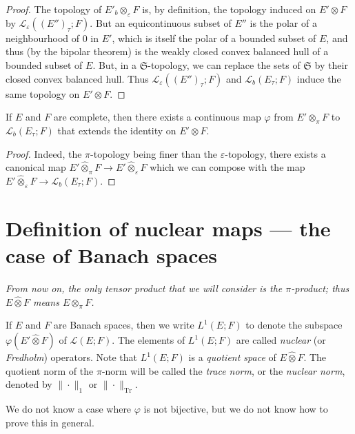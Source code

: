 \documentclass{article}
\theoremstyle{plain}
\newenvironment{corollary}[1]
    {\renewcommand\theinnercustomcorollary{#1}\innercustomcorollary}
    {\endinnercustomcorollary}
\theoremstyle{definition}
\newenvironment{definition}[1]
    {\renewcommand\theinnercustomdefinition{#1}\innercustomdefinition}
    {\endinnercustomdefinition}
\newcommand{\LL}{\mathcal{L}}
\newcommand{\projotimes}{{\otimes}_\pi}
\newcommand{\injotimes}{{\otimes}_\varepsilon}
\newcommand{\cprojotimes}{\widehat{\otimes}_\pi}
\newcommand{\cinjotimes}{\widehat{\otimes}_\varepsilon}
\newcommand{\cotimes}{\widehat{\otimes}}
\newcommand{\tr}{\operatorname{Tr}}
\newcommand{\oldpage}[1]{\marginpar{\footnotesize$\Big\vert$ \textit{p.~#1}}}
\begin{document}
\begin{proof}
  The topology of $E'_b\injotimes F$ is, by definition, the topology induced on $E'\otimes F$ by $\LL_\varepsilon((E'')_\tau;F)$.
  But an equicontinuous subset of $E''$ is the  polar of a neighbourhood of $0$ in $E'$, which is itself the polar of a bounded subset of $E$, and thus (by the bipolar theorem) is the weakly closed convex balanced hull of a bounded subset of $E$.
  But, in a $\mathfrak{S}$-topology, we can replace the sets of $\mathfrak{S}$ by their closed convex balanced hull.
  Thus $\LL_\varepsilon((E'')_\tau;F)$ and $\LL_b(E_\tau;F)$ induce the same topology on $E'\otimes F$.
\end{proof}

\begin{corollary}{1}
\label{corollary-1}
  If $E$ and $F$ are complete, then there exists a continuous map $\varphi$ from $E'\projotimes F$ to $\LL_b(E_\tau;F)$ that extends the identity on $E'\otimes F$.
\end{corollary}

\begin{proof}
  Indeed, the $\pi$-topology being finer than the $\varepsilon$-topology, there exists a canonical map $E'\cprojotimes F\to E'\cinjotimes F$ which we can compose with the map $E'\cinjotimes F\to \LL_b(E_\tau;F)$.
\end{proof}

\section{Definition of nuclear maps — the case of Banach spaces}
\label{section3}

\oldpage{3}
\emph{From now on, the only tensor product that we will consider is the $\pi$-product; thus $E\cotimes F$ means $E\cprojotimes F$.}

\begin{definition}{1}
\label{definition1}
  If $E$ and $F$ are Banach spaces, then we write $L^1(E;F)$ to denote the subspace $\varphi(E'\cotimes F)$ of $\LL(E;F)$.
  The elements of $L^1(E;F)$ are called \emph{nuclear} (or \emph{Fredholm}) operators.
  Note that $L^1(E;F)$ is a \emph{quotient space} of $E\cotimes F$.
  The quotient norm of the $\pi$-norm will be called the \emph{trace norm}, or the \emph{nuclear norm}, denoted by $\|\cdot\|_1$ or $\|\cdot\|_{\tr}$.
\end{definition}

We do not know a case where $\varphi$ is not bijective, but we do not know how to prove this in general.
\end{document}
